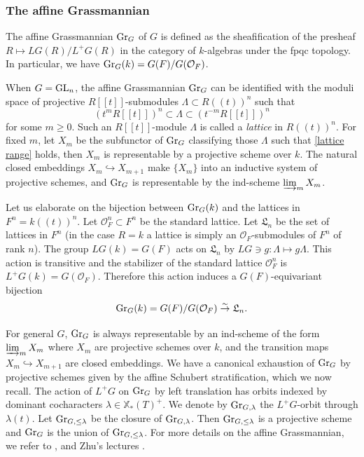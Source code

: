 \documentclass[]{pcmi}
\let\oldsubsubsection\subsubsection
\renewcommand{\subsubsection}[1]{%
\setcounter{subsubsection}{\value{equation}}%
\oldsubsubsection{#1}%
\refstepcounter{equation}%
}
\theoremstyle{plain}
\theoremstyle{definition}
\def\calO{\mathcal{O}}
\newcommand\frL{\mathfrak{L}}
\newcommand{\Gr}{\textup{Gr}}
\newcommand\GL{\textup{GL}}
\newcommand\xcoch{\mathbb{X}_*}
\newcommand{\incl}{\hookrightarrow}
\newcommand{\isom}{\stackrel{\sim}{\to}}
\renewcommand{\l}{\lambda}
\renewcommand{\L}{\Lambda}
\newcommand{\tl}[1]{[\![#1]\!]}
\newcommand{\lr}[1]{(\!(#1)\!)}
\begin{document}
\subsubsection{The affine Grassmannian}\label{sss:Gr} The affine Grassmannian $\Gr_{G}$ of $G$ is defined as the sheafification of the presheaf $R\mapsto LG(R)/L^{+}G(R)$ in the category of $k$-algebras under the fpqc topology.
In particular, we have $\Gr_{G}(k)=G(F)/G(\calO_{F})$. 

When $G=\GL_{n}$, the affine Grassmannian $\Gr_{G}$ can be identified with the moduli space of projective $R\tl{t}$-submodules $\L\subset R\lr{t}^{n}$ such that
\begin{equation}\label{lattice range}
(t^{m}R\tl{t})^{n}\subset \L\subset (t^{-m}R\tl{t})^{n}
\end{equation}
for some $m\geq 0$. Such an $R\tl{t}$-module $\L$ is called a {\em lattice} in $R\lr{t}^{n}$.  For fixed $m$, let $X_{m}$ be the subfunctor of $\Gr_{G}$ classifying those $\L$ such that \eqref{lattice range} holds, then $X_{m}$ is representable by a projective scheme over $k$. The natural closed embeddings $X_{m}\incl X_{m+1}$ make $\{X_{m}\}$ into an inductive system of projective schemes, and $\Gr_{G}$ is representable by the ind-scheme $\varinjlim_{m}X_{m}$.

Let us elaborate on the bijection between $\Gr_{G}(k)$ and the lattices in $F^{n}=k\lr{t}^{n}$. Let $\calO_{F}^{n}\subset F^{n}$ be the standard lattice. Let $\frL_{n}$ be the set of lattices in $F^{n}$ (in the case $R=k$ a lattice is simply an $\calO_{F}$-submodules of $F^{n}$ of rank $n$). The group $LG(k)=G(F)$ acts on $\frL_{n}$ by $LG\ni g:\L\mapsto g\L$. This action is transitive and the stabilizer of the standard lattice $\calO^{n}_{F}$ is $L^{+}G(k)=G(\calO_{F})$. Therefore this action induces a $G(F)$-equivariant bijection
\begin{equation}\label{Gr lattices}
\Gr_{G}(k)=G(F)/G(\calO_{F})\isom \frL_{n}.
\end{equation}


For general $G$, $\Gr_{G}$ is always representable by an ind-scheme of the form $\varinjlim_{m}X_{m}$ where $X_{m}$ are projective schemes over $k$, and the transition maps $X_{m}\incl X_{m+1}$ are closed embeddings.  We have a canonical exhaustion of $\Gr_{G}$ by projective schemes given by the affine Schubert stratification, which we now recall. The action of $L^{+}G$ on $\Gr_{G}$ by left translation has orbits indexed by dominant cocharacters $\l\in\xcoch(T)^{+}$. We denote by $\Gr_{G,\l}$ the $L^{+}G$-orbit through $\l(t)$. Let $\Gr_{G,\leq \l}$ be the closure of $\Gr_{G,\l}$. Then $\Gr_{G,\leq\l}$ is a projective scheme and $\Gr_{G}$ is the union of $\Gr_{G,\leq\l}$. For more details on the affine Grassmannian, we refer to \cite[\S2]{BL}, \cite[\S2]{Faltings} and Zhu's lectures \cite{Zhu}.
\end{document}
